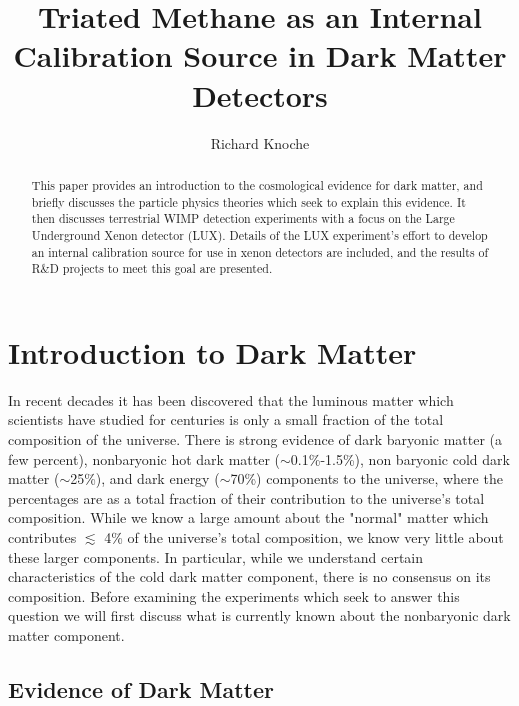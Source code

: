\documentclass[a4paper,12pt]{article}
\begin{document}
\title{Triated Methane as an Internal Calibration Source in Dark Matter Detectors}
\author{Richard Knoche}
\maketitle

\begin{abstract}
This paper provides an introduction to the cosmological evidence for dark matter, and briefly discusses the particle physics theories which seek to explain this evidence.  It then discusses terrestrial WIMP detection experiments with a focus on the Large Underground Xenon detector (LUX).  Details of the LUX experiment's effort to develop an internal calibration source for use in xenon detectors are included, and the results of R\&D projects to meet this goal are presented.
\end{abstract}

\tableofcontents



\section{Introduction to Dark Matter}

In recent decades it has been discovered that the luminous matter which scientists have studied for centuries is only a small fraction of the total composition of the universe.  There is strong evidence of dark baryonic matter (a few percent), nonbaryonic hot dark matter ($\sim$0.1\%-1.5\%), non baryonic cold dark matter ($\sim$25\%), and dark energy ($\sim$70\%) components to the universe, where the percentages are as a total fraction of their contribution to the universe's total composition.  While we know a large amount about the "normal" matter which contributes $ \lesssim $ 4\% of the universe's total composition, we know very little about these larger components.  In particular, while we understand certain characteristics of the cold dark matter component, there is no consensus on its composition.  Before examining the experiments which seek to answer this question we will first discuss what is currently known about the nonbaryonic dark matter component.

\subsection{Evidence of Dark Matter}
\end{document}
